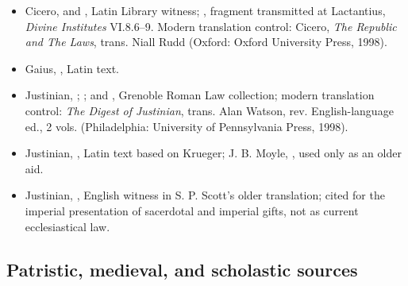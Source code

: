 \begin{itemize}
\item Cicero,  and , Latin Library witness; , fragment transmitted at Lactantius, \emph{Divine Institutes} VI.8.6--9. Modern translation control: Cicero, \emph{The Republic and The Laws}, trans. Niall Rudd (Oxford: Oxford University Press, 1998).
\item Gaius, , Latin text.
\item Justinian, ; ; and , Grenoble Roman Law collection; modern translation control: \emph{The Digest of Justinian}, trans. Alan Watson, rev. English-language ed., 2 vols. (Philadelphia: University of Pennsylvania Press, 1998).
\item Justinian, , Latin text based on Krueger; J. B. Moyle, , used only as an older aid.
\item Justinian, , English witness in S. P. Scott's older translation; cited for the imperial presentation of sacerdotal and imperial gifts, not as current ecclesiastical law.
\end{itemize}

\subsection{Patristic, medieval, and scholastic sources}

